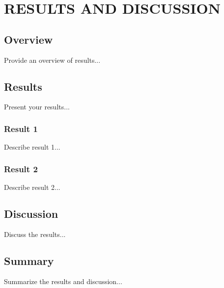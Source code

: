 
\chapter{RESULTS AND DISCUSSION}

\ifpdf
    \graphicspath{{4/figures/PNG}{4/figures/PDF}{4/figures}}
\else
    \graphicspath{{4/figures/EPS}{4/figures}}
\fi

\section{Overview}
Provide an overview of results...

\section{Results}
Present your results...

\subsection{Result 1}
Describe result 1...

\subsection{Result 2}
Describe result 2...

\section{Discussion}
Discuss the results...

\section{Summary}
Summarize the results and discussion...
